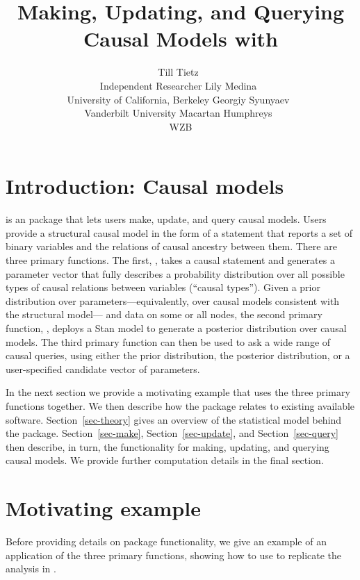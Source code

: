 \documentclass[
  11pt,
  article]{jss}
\author{Till Tietz~\orcidlink{0000-0002-2916-9059}\\Independent
Researcher \And Lily Medina~\orcidlink{0009-0004-2423-524X}\\University
of California, Berkeley \AND Georgiy
Syunyaev~\orcidlink{0000-0002-4391-6313}\\Vanderbilt
University \And Macartan Humphreys~\orcidlink{0000-0001-7029-2326}\\WZB}
\title{Making, Updating, and Querying Causal Models with
\pkg{CausalQueries}}
\renewcommand{\texttt}[1]{\code{#1}}
\begin{document}
\maketitle


\section{Introduction: Causal models}\label{sec-intro}

 is an  package that lets users make,
update, and query causal models. Users provide a structural causal model
in the form of a statement that reports a set of binary variables and
the relations of causal ancestry between them. There are three primary
functions. The first, \texttt{make\_model()}, takes a causal statement
and generates a parameter vector that fully describes a probability
distribution over all possible types of causal relations between
variables (``causal types''). Given a prior distribution over
parameters---equivalently, over causal models consistent with the
structural model--- and data on some or all nodes, the second primary
function, \texttt{update\_model()}, deploys a Stan
\citep{carpenter_stan_2017} model to generate a posterior distribution
over causal models. The third primary function \texttt{query\_model()}
can then be used to ask a wide range of causal queries, using either the
prior distribution, the posterior distribution, or a user-specified
candidate vector of parameters.

In the next section we provide a motivating example that uses the three
primary functions together. We then describe how the package relates to
existing available software. Section~\ref{sec-theory} gives an overview
of the statistical model behind the package. Section~\ref{sec-make},
Section~\ref{sec-update}, and Section~\ref{sec-query} then describe, in
turn, the functionality for making, updating, and querying causal
models. We provide further computation details in the final section.

\section{Motivating example}\label{motivating-example}

Before providing details on package functionality, we give an example of
an application of the three primary functions, showing how to use
 to replicate the analysis in
\citetext{\citealp{chickering_clinicians_1996}; \citealp[see
also][]{humphreys_integrated_2023}}.
\end{document}
